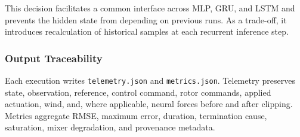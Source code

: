 This decision facilitates a common interface across MLP, GRU, and LSTM and prevents the hidden state from depending on previous runs. As a trade-off, it introduces recalculation of historical samples at each recurrent inference step.

\subsubsection*{Output Traceability}

Each execution writes \texttt{telemetry.json} and \texttt{metrics.json}. Telemetry preserves state, observation, reference, control command, rotor commands, applied actuation, wind, and, where applicable, neural forces before and after clipping. Metrics aggregate RMSE, maximum error, duration, termination cause, saturation, mixer degradation, and provenance metadata.
